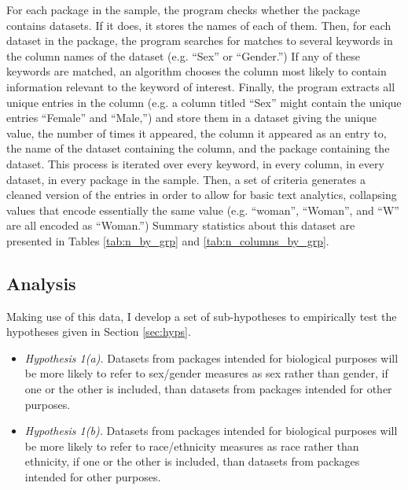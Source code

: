 For each package in the sample, the program checks whether the package contains datasets. If it does, it stores the names of each of them. Then, for each dataset in the package, the program searches for matches to several keywords in the column names of the dataset (e.g. ``Sex'' or ``Gender.'') If any of these keywords are matched, an algorithm chooses the column most likely to contain information relevant to the keyword of interest. Finally, the program extracts all unique entries in the column (e.g. a column titled ``Sex'' might contain the unique entries ``Female'' and ``Male,'') and store them in a dataset giving the unique value, the number of times it appeared, the column it appeared as an entry to, the name of the dataset containing the column, and the package containing the dataset. This process is iterated over every keyword, in every column, in every dataset, in every package in the sample. Then, a set of criteria generates a cleaned version of the entries in order to allow for basic text analytics, collapsing values that encode essentially the same value (e.g. ``woman'', ``Woman'', and ``W'' are all encoded as ``Woman.'') Summary statistics about this dataset are presented in Tables \ref{tab:n_by_grp} and \ref{tab:n_columns_by_grp}.

\subsection{Analysis} \label{sec:analysis}

\hspace{13pt} Making use of this data, I develop a set of sub-hypotheses to empirically test the hypotheses given in Section \ref{sec:hyps}.

\begin{itemize}
  \item \textit{Hypothesis 1(a).} Datasets from packages intended for biological purposes will be more likely to refer to sex/gender measures as sex rather than gender, if one or the other is included, than datasets from packages intended for other purposes.
  \item \textit{Hypothesis 1(b).} Datasets from packages intended for biological purposes will be more likely to refer to race/ethnicity measures as race rather than ethnicity, if one or the other is included, than datasets from packages intended for other purposes.
\end{itemize}

